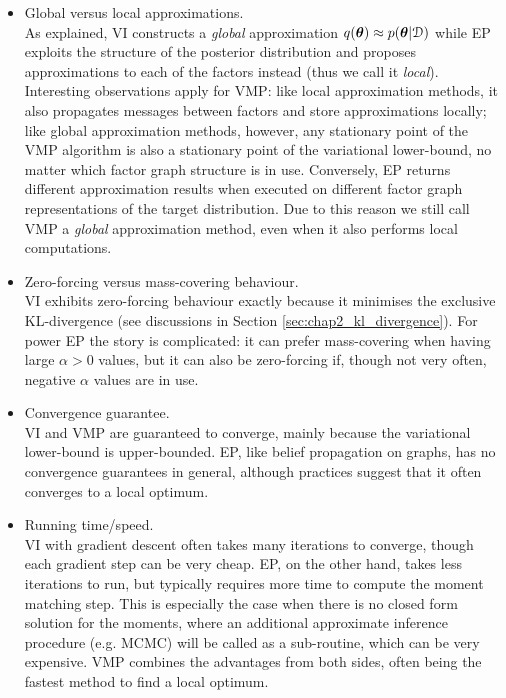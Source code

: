 \begin{itemize}
\item Global versus local approximations. \\
%
As explained, VI constructs a \emph{global} approximation $q(\bm{\theta}) \approx p(\bm{\theta}|\mathcal{D})$ while EP exploits the structure of the posterior distribution and proposes approximations to each of the factors instead (thus we call it \emph{local}). Interesting observations apply for VMP: like local approximation methods, it also propagates messages between factors and store approximations locally; like global approximation methods, however, any stationary point of the VMP algorithm is also a stationary point of the variational lower-bound, no matter which factor graph structure is in use. Conversely, EP returns different approximation results when executed on different factor graph representations of the target distribution. Due to this reason we still call VMP a \emph{global} approximation method, even when it also performs local computations.

\item Zero-forcing versus mass-covering behaviour. \\
VI exhibits zero-forcing behaviour exactly because it minimises the exclusive KL-divergence (see discussions in Section \ref{sec:chap2_kl_divergence}). For power EP the story is complicated: it can prefer mass-covering when having large $\alpha > 0$ values, but it can also be zero-forcing if, though not very often, negative $\alpha$ values are in use.

\item Convergence guarantee. \\
VI and VMP are guaranteed to converge, mainly because the variational lower-bound is upper-bounded. EP, like belief propagation on graphs, has no convergence guarantees in general, although practices suggest that it often converges to a local optimum.

\item Running time/speed. \\
VI with gradient descent often takes many iterations to converge, though each gradient step can be very cheap. EP, on the other hand, takes less iterations to run, but typically requires more time to compute the moment matching step. This is especially the case when there is no closed form solution for the moments, where an additional approximate inference procedure (e.g. MCMC) will be called as a sub-routine, which can be very expensive. VMP combines the advantages from both sides, often being the fastest method to find a local optimum.


\end{itemize}
